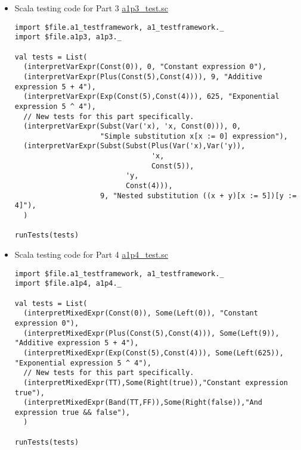 \documentclass[11pt]{article}
\begin{document}
\begin{itemize}
\item Scala testing code for Part 3
\label{sec:org883caa1}
\href{./testing/a1/a1p3\_test.sc}{a1p3\_test.sc}
\begin{verbatim}
import $file.a1_testframework, a1_testframework._
import $file.a1p3, a1p3._

val tests = List(
  (interpretVarExpr(Const(0)), 0, "Constant expression 0"),
  (interpretVarExpr(Plus(Const(5),Const(4))), 9, "Additive expression 5 + 4"),
  (interpretVarExpr(Exp(Const(5),Const(4))), 625, "Exponential expression 5 ^ 4"),
  // New tests for this part specifically.
  (interpretVarExpr(Subst(Var('x), 'x, Const(0))), 0,
                    "Simple substitution x[x := 0] expression"),
  (interpretVarExpr(Subst(Subst(Plus(Var('x),Var('y)),
                                'x,
                                Const(5)),
                          'y,
                          Const(4))),
                    9, "Nested substitution ((x + y)[x := 5])[y := 4]"),
  )

runTests(tests)
\end{verbatim}

\item Scala testing code for Part 4
\label{sec:org26eba0d}
\href{./testing/a1/a1p4\_test.sc}{a1p4\_test.sc}
\begin{verbatim}
import $file.a1_testframework, a1_testframework._
import $file.a1p4, a1p4._

val tests = List(
  (interpretMixedExpr(Const(0)), Some(Left(0)), "Constant expression 0"),
  (interpretMixedExpr(Plus(Const(5),Const(4))), Some(Left(9)), "Additive expression 5 + 4"),
  (interpretMixedExpr(Exp(Const(5),Const(4))), Some(Left(625)), "Exponential expression 5 ^ 4"),
  // New tests for this part specifically.
  (interpretMixedExpr(TT),Some(Right(true)),"Constant expression true"),
  (interpretMixedExpr(Band(TT,FF)),Some(Right(false)),"And expression true && false"),
  )

runTests(tests)
\end{verbatim}
\end{itemize}
\end{document}
